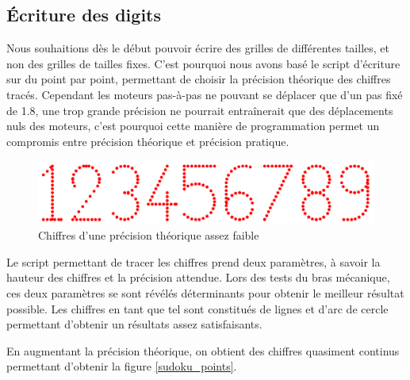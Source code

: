 \documentclass[12pt,a4paper]{report}
\begin{document}
\subsection*{Écriture des digits}
Nous souhaitions dès le début pouvoir écrire des grilles de différentes tailles, et non des grilles de tailles fixes. C'est pourquoi nous avons basé le script d'écriture sur du point par point, permettant de choisir la précision théorique des chiffres tracés. Cependant les moteurs pas-à-pas ne pouvant se déplacer que d'un pas fixé de 1.8\degre, une trop grande précision ne pourrait entraînerait que des déplacements nuls des moteurs, c'est pourquoi cette manière de programmation permet un compromis entre précision théorique et précision pratique.

\begin{figure}[!h]
 \center
 \includegraphics[scale=0.35]{../pictures/numbers}
 \caption{Chiffres d'une précision théorique assez faible}
\end{figure}

Le script permettant de tracer les chiffres prend deux paramètres, à savoir la hauteur des chiffres et la précision attendue. Lors des tests du bras mécanique, ces deux paramètres se sont révélés déterminants pour obtenir le meilleur résultat possible. Les chiffres en tant que tel sont constitués de lignes et d'arc de cercle permettant d'obtenir un résultats assez satisfaisants.

En augmentant la précision théorique, on obtient des chiffres quasiment continus permettant d'obtenir la figure \ref{sudoku_points}.
\end{document}
